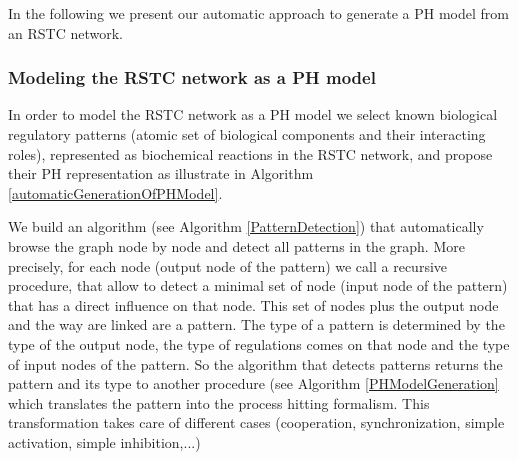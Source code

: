 In the following we present our automatic approach to generate a PH model from an RSTC network.


\subsubsection{Modeling the RSTC network as a PH model}



In order to model the RSTC network as a PH model we select known biological regulatory patterns (atomic set of biological components and their interacting roles), represented 
as biochemical reactions in the RSTC network, and propose their PH representation as illustrate in Algorithm \ref{automaticGenerationOfPHModel}. 

We build an algorithm (see Algorithm \ref{PatternDetection}) that automatically browse the graph node by node and detect all patterns in the graph. More precisely, for each node (output node of the pattern) we  call a recursive procedure,
that  allow  to detect a minimal set of node (input node of the pattern) that has a direct influence on that node. This set of nodes plus the output node and the way  are linked are a pattern. 
The type of a pattern is determined by the type of the output node, the type of regulations comes on that node and the type of input nodes of the pattern. So the algorithm that detects patterns returns the pattern 
and its type to another procedure (see Algorithm \ref{PHModelGeneration} which  translates the pattern into the process hitting formalism. This transformation  takes care of different cases (cooperation, synchronization, simple activation, simple inhibition,...)





